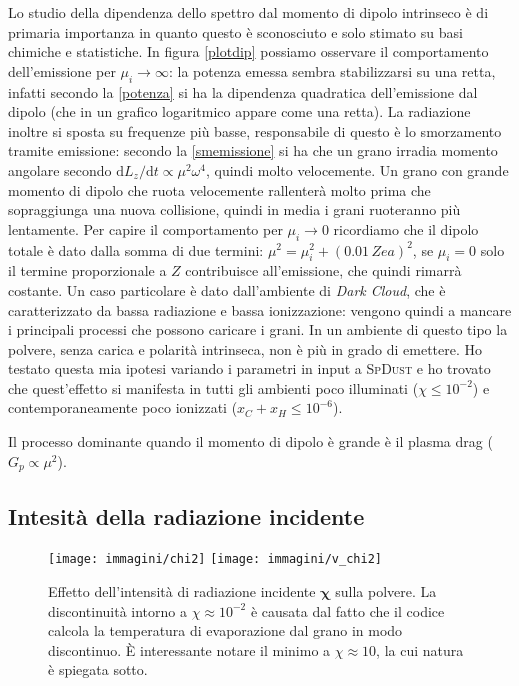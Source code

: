 Lo studio della dipendenza dello spettro dal momento di dipolo intrinseco è di primaria importanza in quanto questo è sconosciuto e solo stimato su basi chimiche e statistiche. In figura \ref{plotdip} possiamo osservare il comportamento dell'emissione per $\mu_i\rightarrow\infty$: la potenza emessa sembra stabilizzarsi su una retta, infatti secondo la \ref{potenza} si ha la dipendenza quadratica dell'emissione dal dipolo (che in un grafico logaritmico appare come una retta). La radiazione inoltre si sposta su frequenze più basse, responsabile di questo è lo smorzamento tramite emissione: secondo la \ref{smemissione} si ha che un grano irradia momento angolare secondo $\mathrm{d}L_z/\mathrm{d}t \propto \mu^2\omega^4$, quindi molto velocemente. Un grano con grande momento di dipolo che ruota velocemente rallenterà molto prima che sopraggiunga una nuova collisione, quindi in media i grani ruoteranno più lentamente.
Per capire il comportamento per $\mu_i\rightarrow0$ ricordiamo che il dipolo totale è dato dalla somma di due termini: $\mu^2 = \mu^2_i + (0.01\,Zea)^2$, se $\mu_i=0$ solo il termine proporzionale a $Z$ contribuisce all'emissione, che quindi rimarrà costante. Un caso particolare è dato dall'ambiente di \textit{Dark Cloud}, che è caratterizzato da bassa radiazione e bassa ionizzazione: vengono quindi a mancare i principali processi che possono caricare i grani. In un ambiente di questo tipo la polvere, senza carica e polarità intrinseca, non è più in grado di emettere. Ho testato questa mia ipotesi variando i parametri in input a \textsc{SpDust} e ho trovato che quest'effetto si manifesta in tutti gli ambienti poco illuminati ($\chi\leqslant10^{-2}$) e contemporaneamente poco ionizzati ($x_C+x_H\leqslant10^{-6}$).

Il processo dominante quando il momento di dipolo è grande è il plasma drag ($G_p \propto \mu^2$).


\subsection{Intesità della radiazione incidente}
\begin{figure}
	
	\centerline{
		\centering
		\subfigure
		{\texttt{[image: immagini/chi2]}}
		\hspace{-5mm}
		\subfigure
		{\texttt{[image: immagini/v\_chi2]}}
	}
	\caption{Effetto dell'intensità di radiazione incidente $\boldsymbol{\chi}$ sulla polvere. La discontinuità intorno a $\chi\approx10^{-2}$ è causata dal fatto che il codice calcola la temperatura di evaporazione dal grano in modo discontinuo. È interessante notare il minimo a $\chi\approx10$, la cui natura è spiegata sotto.}
	\label{plotchi}
\end{figure}

